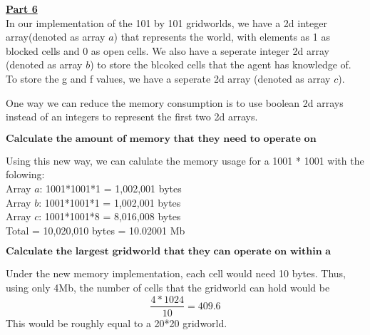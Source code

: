 \documentclass[12pt]{amsart}
\begin{document}
\medskip\noindent\textbf{\underline{Part 6}} \\
In our implementation of the 101 by 101 gridworlds, we have a 2d integer array(denoted as array $a$) that represents the world, with elements as 1 as blocked cells and 0 as open cells. We also have a seperate integer 2d array (denoted as array $b$) to store the blcoked cells that the agent has knowledge of. To store the g and f values, we have a seperate 2d array (denoted as array $c$).

One way we can reduce the memory consumption is to use  boolean 2d arrays instead of an integers to represent the first two 2d arrays.

$\textbf{Calculate the amount of memory that they need to operate on
gridworlds of size 1001*1001}$

Using this new way, we can calulate the memory usage for a 1001 * 1001 with the folowing:
\\Array $a$: 1001*1001*1 = 1,002,001 bytes
\\Array $b$: 1001*1001*1 = 1,002,001 bytes
\\Array $c$: 1001*1001*8 = 8,016,008 bytes
\\Total = 10,020,010 bytes = 10.02001 Mb 

$\textbf{Calculate the largest gridworld that they can operate on within a
memory limit of 4 MBytes}$ 

Under the new memory implementation, each cell would need 10 bytes. Thus, using only 4Mb, the number of cells that the gridworld can hold would be
$$ \frac{4*1024}{10} = 409.6$$
This would be roughly equal to a 20*20 gridworld.
\end{document}
